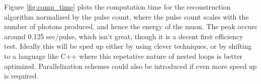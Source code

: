 Figure \ref{fig:comp_time} plots the computation time for the reconstruction algorithm normalized by the pulse count, where the pulse count scales with the number of photons produced, and hence the energy of the muon. The peak occurs around 0.125 sec/pulse, which isn't great, though it is a decent first efficiency test. Ideally this will be sped up either by using clever techniques, or by shifting to a language like C++ where this repetative nature of nested loops is better optimized. Parallelization schemes could also be introduced if even more speed up is required. 


